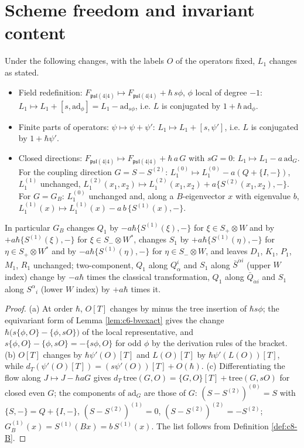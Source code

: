 \section{Scheme freedom and invariant content}

\begin{proposition}
\label{prop:c8-laws}
Under the following changes, with the labels $O$ of the operators fixed, $L_1$ changes as stated.
\begin{itemize}
\item[(a)] Field redefinition: $F_{\mathfrak{psl}(4|4)}\mapsto F_{\mathfrak{psl}(4|4)}+\hbar\,s\phi$, $\phi$ local of degree $-1$: $L_1\mapsto L_1+[s,\mathrm{ad}_\phi]=L_1-\mathrm{ad}_{s\phi}$, i.e. $L$ is conjugated by $1+\hbar\,\mathrm{ad}_\phi$.
\item[(b)] Finite parts of operators: $\psi\mapsto\psi+\psi'$: $L_1\mapsto L_1+[s,\psi']$, i.e. $L$ is conjugated by $1+\hbar\psi'$.
\item[(c)] Closed directions: $F_{\mathfrak{psl}(4|4)}\mapsto F_{\mathfrak{psl}(4|4)}+\hbar\,a\,G$ with $sG=0$: $L_1\mapsto L_1-a\,\mathrm{ad}_G$. For the coupling direction $G=S-S^{(2)}$: $L_1^{(0)}\mapsto L_1^{(0)}-a(Q+\{I,-\})$, $L_1^{(1)}$ unchanged, $L_1^{(2)}(x_1,x_2)\mapsto L_1^{(2)}(x_1,x_2)+a\{S^{(2)}(x_1,x_2),-\}$. For $G=G_B$: $L_1^{(0)}$ unchanged and, along a $B$-eigenvector $x$ with eigenvalue $b$, $L_1^{(1)}(x)\mapsto L_1^{(1)}(x)-a\,b\,\{S^{(1)}(x),-\}$.
\end{itemize}
In particular $G_B$ changes $Q_1$ by $-a\hbar\{S^{(1)}(\xi),-\}$ for $\xi\in S_+\otimes W$ and by $+a\hbar\{S^{(1)}(\xi),-\}$ for $\xi\in S_-\otimes W^*$, changes $S_1$ by $+a\hbar\{S^{(1)}(\eta),-\}$ for $\eta\in S_+\otimes W^*$ and by $-a\hbar\{S^{(1)}(\eta),-\}$ for $\eta\in S_-\otimes W$, and leaves $D_1$, $K_1$, $P_1$, $M_1$, $R_1$ unchanged; two-component, $Q_1$ along $Q^i_\alpha$ and $S_1$ along $\bar S^{\dot\alpha i}$ (upper $W$ index) change by $-a\hbar$ times the classical transformation, $Q_1$ along $\bar Q_{\dot\alpha i}$ and $S_1$ along $S^\alpha{}_i$ (lower $W$ index) by $+a\hbar$ times it.
\end{proposition}

\begin{proof}
(a) At order $\hbar$, $O[T]$ changes by minus the tree insertion of $\hbar s\phi$; the equivariant form of Lemma \ref{lem:c6-bvexact} gives the change $\hbar\big(s\{\phi,O\}-\{\phi,sO\}\big)$ of the local representative, and $s\{\phi,O\}-\{\phi,sO\}=-\{s\phi,O\}$ for odd $\phi$ by the derivation rules of the bracket. (b) $O[T]$ changes by $\hbar\psi'(O)[T]$ and $L(O)[T]$ by $\hbar\psi'(L(O))[T]$, while $d_T(\psi'(O)[T])=(s\psi'(O))[T]+O(\hbar)$. (c) Differentiating the flow along $J\mapsto J-\hbar aG$ gives $d_T\,\mathrm{tree}(G,O)=\{G,O\}[T]+\mathrm{tree}(G,sO)$ for closed even $G$; the components of $\mathrm{ad}_G$ are those of $G$: $(S-S^{(2)})^{(0)}=S$ with $\{S,-\}=Q+\{I,-\}$, $(S-S^{(2)})^{(1)}=0$, $(S-S^{(2)})^{(2)}=-S^{(2)}$; $G_B^{(1)}(x)=S^{(1)}(Bx)=b\,S^{(1)}(x)$. The list follows from Definition \ref{def:c8-B}.
\end{proof}

